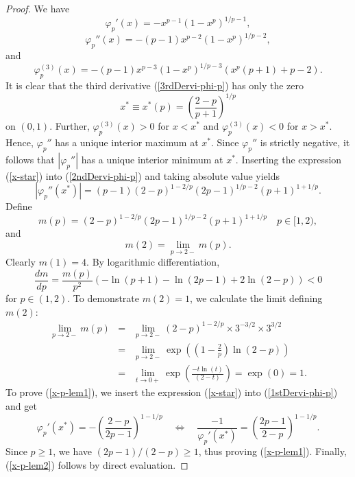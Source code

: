 \documentclass{amsart}
\numberwithin{equation}{section}
\begin{document}
\begin{proof}
We have
\begin{equation}
    \label{1stDervi-phi-p}
    \varphi_p'(x)=-x^{p-1}(1-x^p)^{1/p-1},
\end{equation}
\begin{equation}
    \label{2ndDervi-phi-p}
    \varphi_p''(x)=-(p-1)x^{p-2}(1-x^p)^{1/p-2},
\end{equation}
and
\begin{equation}
    \label{3rdDervi-phi-p}
    \varphi_p^{(3)}(x)=-(p-1)x^{p-3}(1-x^p)^{1/p-3}\left(x^p(p+1)+p-2\right).
\end{equation}
It is clear that the third derivative (\ref{3rdDervi-phi-p}) has only the zero
\begin{equation}
    \label{x-star}
    x^*\equiv x^*(p)=\left(\frac{2-p}{p+1}\right)^{1/p}
\end{equation}
on $(0,1)$. Further, $\varphi_p^{(3)}(x)>0$ for $x<x^*$ and $\varphi_p^{(3)}(x)<0$ for $x>x^*$. Hence, $\varphi_p''$ has a unique interior maximum at $x^*$. Since $\varphi_p''$ is strictly negative, it follows that $|\varphi_p''|$ has a unique interior minimum at $x^*$.
Inserting the expression (\ref{x-star}) into (\ref{2ndDervi-phi-p}) and taking absolute value yields
$$
|\varphi_p''(x^*)|=(p-1)(2-p)^{1-2/p}(2p-1)^{1/p-2}(p+1)^{1+1/p}.
$$
Define
$$
m(p)=(2-p)^{1-2/p}(2p-1)^{1/p-2}(p+1)^{1+1/p}\quad p\in[1,2), 
$$
and
$$
m(2)=\lim_{p\rightarrow2-}m(p).
$$
Clearly $m(1)=4$. By logarithmic differentiation,
$$
\frac{dm}{dp}=\frac{m(p)}{p^2}(-\ln(p+1)-\ln(2p-1)+2\ln(2-p))<0
$$
for $p\in(1,2)$. To demonstrate $m(2)=1$, we calculate the limit defining $m(2)$:
\begin{eqnarray}
\nonumber
\lim_{p\rightarrow2-}m(p)&=&\lim_{p\rightarrow2-}(2-p)^{1-2/p}\times 3^{-3/2}\times3^{3/2}\\
\nonumber
&=&\lim_{p\rightarrow2-}\exp\left(\left(1-\frac{2}{p}\right)\ln(2-p)\right)\\
\nonumber
&=&\lim_{t\rightarrow0+}\exp\left(\frac{-t\ln(t)}{(2-t)}\right)=\exp(0)=1.
\end{eqnarray}
To prove (\ref{x-p-lem1}), we insert the expression (\ref{x-star}) into (\ref{1stDervi-phi-p}) and get
$$
\varphi_p'(x^*)=-\left(\frac{2-p}{2p-1}\right)^{1-1/p}\quad\Leftrightarrow\quad\frac{-1}{\varphi_p'(x^*)}=\left(\frac{2p-1}{2-p}\right)^{1-1/p}.
$$
Since $p\ge1$, we have $(2p-1)/(2-p)\ge1$, thus proving (\ref{x-p-lem1}). Finally, (\ref{x-p-lem2}) follows by direct evaluation.
\end{proof}
\end{document}
